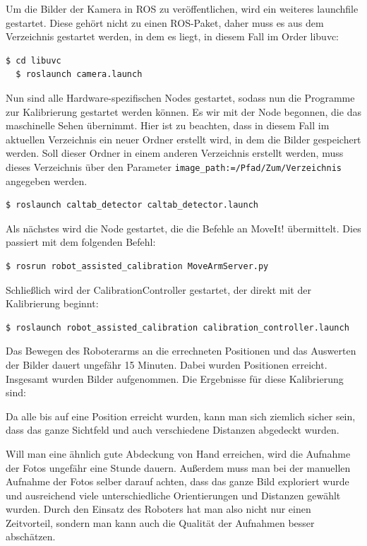 Um die Bilder der Kamera in ROS zu veröffentlichen, wird ein weiteres launchfile gestartet. Diese gehört nicht zu einen ROS-Paket, daher muss es aus dem Verzeichnis gestartet werden, in dem es liegt, in diesem Fall im Order libuvc: 
\begin{lstlisting}[language=bash]
  $ cd libuvc
  $ roslaunch camera.launch
\end{lstlisting}

Nun sind alle Hardware-spezifischen Nodes gestartet, sodass nun die Programme zur Kalibrierung gestartet werden können. Es wir mit der Node begonnen, die das maschinelle Sehen übernimmt. Hier ist zu beachten, dass in diesem Fall im aktuellen Verzeichnis ein neuer Ordner erstellt wird, in dem die Bilder gespeichert werden. Soll dieser Ordner in einem anderen Verzeichnis erstellt werden, muss dieses Verzeichnis über den Parameter \texttt{image\_path:=/Pfad/Zum/Verzeichnis} angegeben werden.
\begin{lstlisting}[language=bash]
  $ roslaunch caltab_detector caltab_detector.launch
\end{lstlisting}

Als nächstes wird die Node gestartet, die die Befehle an MoveIt! übermittelt. Dies passiert mit dem folgenden Befehl:
\begin{lstlisting}[language=bash]
  $ rosrun robot_assisted_calibration MoveArmServer.py
\end{lstlisting}

Schließlich wird der CalibrationController gestartet, der direkt mit der Kalibrierung beginnt:
\begin{lstlisting}[language=bash]
  $ roslaunch robot_assisted_calibration calibration_controller.launch
\end{lstlisting}

Das Bewegen des Roboterarms an die errechneten Positionen und das Auswerten der Bilder dauert ungefähr 15 Minuten. Dabei wurden  Positionen erreicht. Insgesamt wurden  Bilder aufgenommen. Die Ergebnisse für diese Kalibrierung sind: 

Da alle bis auf eine Position erreicht wurden, kann man sich ziemlich sicher sein, dass das ganze Sichtfeld und auch verschiedene Distanzen abgedeckt wurden. 

Will man eine ähnlich gute Abdeckung von Hand erreichen, wird die Aufnahme der Fotos ungefähr eine Stunde dauern. Außerdem muss man bei der manuellen Aufnahme der Fotos selber darauf achten, dass das ganze Bild exploriert wurde und ausreichend viele unterschiedliche Orientierungen und Distanzen gewählt wurden. Durch den Einsatz des Roboters hat man also nicht nur einen Zeitvorteil, sondern man kann auch die Qualität der Aufnahmen besser abschätzen.
